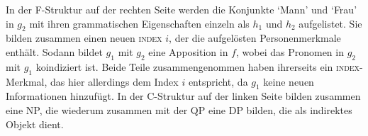 In der F-Struktur auf der rechten Seite werden die Konjunkte  `Mann'
und  `Frau' in $g_2$ mit ihren grammatischen Eigenschaften einzeln
als $h_1$ und $h_2$ aufgelistet. Sie bilden zusammen einen neuen \textsc{index}
$i$, der die aufgelösten Personenmerkmale enthält. Sodann bildet $g_1$ mit
$g_2$ eine Apposition in $f$, wobei das Pronomen  in $g_2$ mit
$g_1$ koindiziert ist. Beide Teile zusammengenommen haben ihrerseits ein
\textsc{index}-Merkmal, das hier allerdings dem Index $i$ entspricht, da $g_1$
keine neuen Informationen hinzufügt. In der C-Struktur auf der linken Seite
bilden  zusammen eine NP, die wiederum zusammen mit der QP
 eine DP bilden, die als indirektes Objekt dient.
